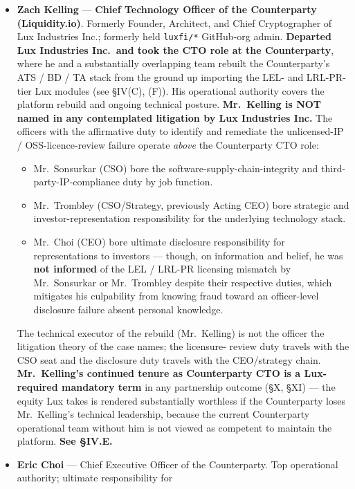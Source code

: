 \documentclass[11pt,letterpaper]{article}
\begin{document}
\begin{itemize}[leftmargin=1.5em,itemsep=0.2em]
\item \textbf{Zach Kelling} --- \textbf{Chief Technology Officer of
the Counterparty (Liquidity.io)}. Formerly Founder, Architect, and
Chief Cryptographer of Lux Industries Inc.; formerly held
\texttt{luxfi/*} GitHub-org admin. \textbf{Departed Lux Industries
Inc.\ and took the CTO role at the Counterparty}, where he and a
substantially overlapping team rebuilt the Counterparty's ATS / BD /
TA stack from the ground up importing the LEL- and LRL-PR-tier Lux
modules (see \S IV(C), (F)). His operational authority covers the
platform rebuild and ongoing technical posture. \textbf{Mr.\ Kelling
is NOT named in any contemplated litigation by Lux Industries Inc.}
The officers with the affirmative duty to identify and remediate the
unlicensed-IP / OSS-licence-review failure operate \emph{above}
the Counterparty CTO role:
\begin{itemize}[leftmargin=2em,itemsep=0.1em]
\item Mr.\ Sonsurkar (CSO) bore the software-supply-chain-integrity
and third-party-IP-compliance duty by job function.
\item Mr.\ Trombley (CSO/Strategy, previously Acting CEO) bore
strategic and investor-representation responsibility for the
underlying technology stack.
\item Mr.\ Choi (CEO) bore ultimate disclosure responsibility for
representations to investors --- though, on information and belief,
he was \textbf{not informed} of the LEL / LRL-PR licensing
mismatch by Mr.\ Sonsurkar or Mr.\ Trombley despite their
respective duties, which mitigates his culpability from knowing
fraud toward an officer-level disclosure failure absent personal
knowledge.
\end{itemize}
The technical executor of the rebuild (Mr.\ Kelling) is not the
officer the litigation theory of the case names; the licensure-
review duty travels with the CSO seat and the disclosure duty
travels with the CEO/strategy chain. \textbf{Mr.\ Kelling's
continued tenure as Counterparty CTO is a Lux-required mandatory
term} in any partnership outcome (\S X, \S XI) --- the equity Lux
takes is rendered substantially worthless if the Counterparty
loses Mr.\ Kelling's technical leadership, because the current
Counterparty operational team without him is not viewed as
competent to maintain the platform. \textbf{See \S IV.E.}
\item \textbf{Eric Choi} --- Chief Executive Officer of the
Counterparty. Top operational authority; ultimate responsibility for

\end{itemize}
\end{document}
